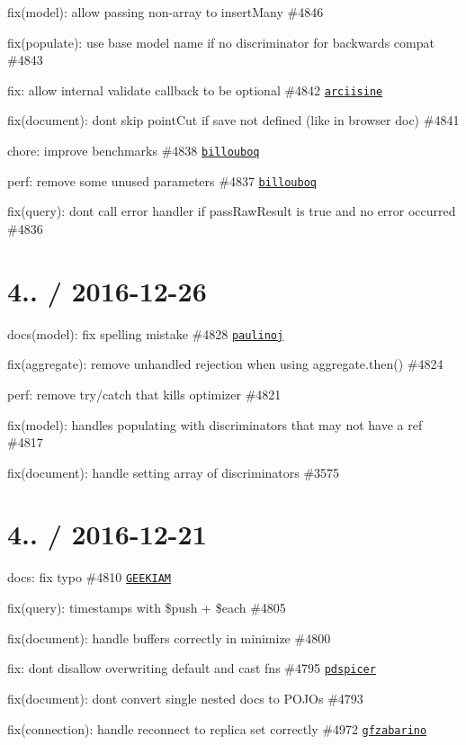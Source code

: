 \begin{DoxyItemize}
\item fix(model)\+: allow passing non-\/array to insert\+Many \#4846
\item fix(populate)\+: use base model name if no discriminator for backwards compat \#4843
\item fix\+: allow internal validate callback to be optional \#4842 \href{https://github.com/arciisine}{\tt arciisine}
\item fix(document)\+: don\textquotesingle{}t skip point\+Cut if save not defined (like in browser doc) \#4841
\item chore\+: improve benchmarks \#4838 \href{https://github.com/billouboq}{\tt billouboq}
\item perf\+: remove some unused parameters \#4837 \href{https://github.com/billouboq}{\tt billouboq}
\item fix(query)\+: don\textquotesingle{}t call error handler if pass\+Raw\+Result is true and no error occurred \#4836
\end{DoxyItemize}

\section*{4.. / 2016-\/12-\/26 }


\begin{DoxyItemize}
\item docs(model)\+: fix spelling mistake \#4828 \href{https://github.com/paulinoj}{\tt paulinoj}
\item fix(aggregate)\+: remove unhandled rejection when using aggregate.\+then() \#4824
\item perf\+: remove try/catch that kills optimizer \#4821
\item fix(model)\+: handles populating with discriminators that may not have a ref \#4817
\item fix(document)\+: handle setting array of discriminators \#3575
\end{DoxyItemize}

\section*{4.. / 2016-\/12-\/21 }


\begin{DoxyItemize}
\item docs\+: fix typo \#4810 \href{https://github.com/GEEKIAM}{\tt G\+E\+E\+K\+I\+AM}
\item fix(query)\+: timestamps with \$push + \$each \#4805
\item fix(document)\+: handle buffers correctly in minimize \#4800
\item fix\+: don\textquotesingle{}t disallow overwriting default and cast fns \#4795 \href{https://github.com/pdspicer}{\tt pdspicer}
\item fix(document)\+: don\textquotesingle{}t convert single nested docs to P\+O\+J\+Os \#4793
\item fix(connection)\+: handle reconnect to replica set correctly \#4972 \href{https://github.com/gfzabarino}{\tt gfzabarino}
\end{DoxyItemize}

